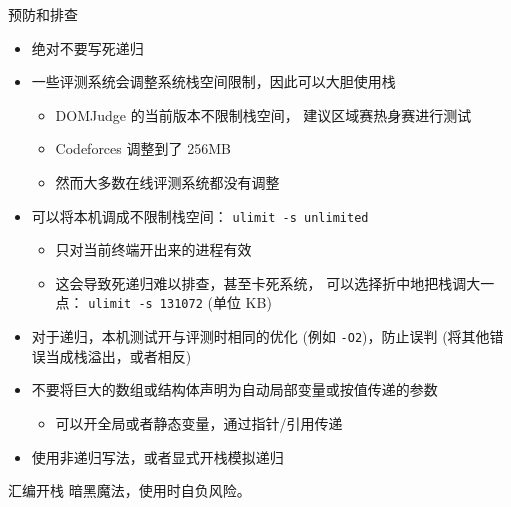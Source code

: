 \documentclass[10pt,mathserif]{beamer}
\begin{document}
\begin{frame}{预防和排查}
	\begin{itemize}
		\item 绝对不要写死递归
		\item 一些评测系统会调整系统栈空间限制，因此可以大胆使用栈
			\begin{itemize}
				\item DOMJudge 的当前版本不限制栈空间，
					建议区域赛热身赛进行测试
				\item Codeforces 调整到了 256MB
				\item 然而大多数在线评测系统都没有调整
			\end{itemize}
		\item 可以将本机调成不限制栈空间：
			\lstinline|ulimit -s unlimited|
			\begin{itemize}
				\item 只对当前终端开出来的进程有效
				\item 这会导致死递归难以排查，甚至卡死系统，
					可以选择折中地把栈调大一点：
					\lstinline|ulimit -s 131072| (单位 KB)
			\end{itemize}
		\item 对于递归，本机测试开与评测时相同的优化
			(例如 \lstinline|-O2|)，防止误判
			(将其他错误当成栈溢出，或者相反)
		\item 不要将巨大的数组或结构体声明为自动局部变量或按值传递的参数
			\begin{itemize}
				\item 可以开全局或者静态变量，通过指针/引用传递
			\end{itemize}
		\item 使用非递归写法，或者显式开栈模拟递归
	\end{itemize}
\end{frame}

\begin{frame}{汇编开栈}
	暗黑魔法，使用时自负风险。
	
\end{frame}
\end{document}
